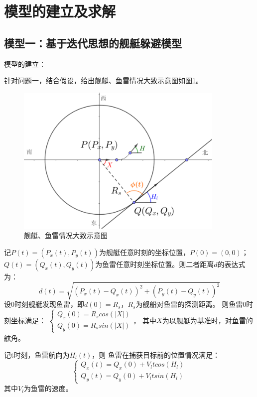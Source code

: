 \documentclass[12pt]{article}%
\begin{document}
\onecolumn
\section{模型的建立及求解}
\subsection{模型一：基于迭代思想的舰艇躲避模型}
模型的建立：

针对问题一，结合假设，给出舰艇、鱼雷情况大致示意图如图\ref{fig:label1}。
\begin{figure}[htb]
\centering
\includegraphics[width=10cm]{TIM20180526232647.png}
\caption{\heiti 舰艇、鱼雷情况大致示意图}
\label{fig:label1}
\end{figure}
记$P(t)=(P_x(t),P_y(t))$为舰艇任意时刻的坐标位置，$P(0)=(0,0)$；$Q(t)=(Q_x(t),Q_y(t))$为鱼雷任意时刻坐标位置。则二者距离$d$的表达式为：
\begin{equation}\label{juligongshi1}
d(t)=\sqrt{(P_x(t)-Q_x(t))^{2}+(P_y(t)-Q_y(t))^2}
\end{equation}
设0时刻舰艇发现鱼雷，即$d(0)=R_s$，$R_s$为舰船对鱼雷的探测距离。
则鱼雷0时刻坐标满足：
$\left\{ 
\begin{array}{c}
Q_x(0)= R_scos(|X|) \\
Q_y(0)=R_ssin(|X|)
\end{array} \right.  $，
其中$X$为以舰艇为基准时，对鱼雷的舷角。

记t时刻，鱼雷航向为$H_l(t)$，则
鱼雷在捕获目标前的位置情况满足：
\begin{equation}\label{yuleiweizhi}
\left\{ 
\begin{array}{c}
Q_x(t)=Q_x(0)+V_ltcos(H_l)\\
Q_y(t)=Q_y(0)+V_ltsin(H_l) 
\end{array} \right.  
\end{equation}
其中$V_l$为鱼雷的速度。
\end{document}
